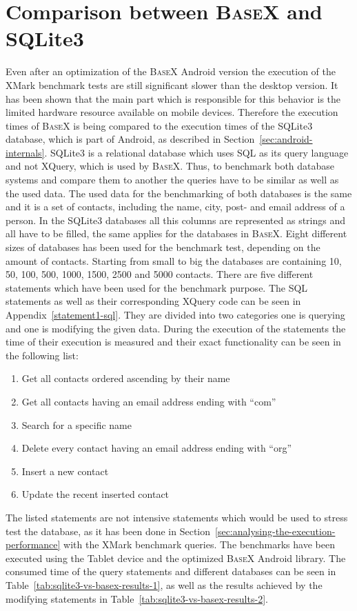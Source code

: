 \section{Comparison between \textsc{BaseX} and SQLite3}
\label{sec:comparison-between-basex-and-sqlite}
Even after an optimization of the \textsc{BaseX} Android version the execution of the XMark benchmark tests are still significant slower than the desktop version.
It has been shown that the main part which is responsible for this behavior is the limited hardware resource available on mobile devices.
Therefore the execution times of \textsc{BaseX} is being compared to the execution times of the SQLite3 database, which is part of Android, as described in Section~\ref{sec:android-internals}.
SQLite3 is a relational database which uses SQL as its query language and not XQuery, which is used by \textsc{BaseX}.
Thus, to benchmark both database systems and compare them to another the queries have to be similar as well as the used data.
The used data for the benchmarking of both databases is the same and it is a set of contacts, including the name, city, post- and email address of a person.
In the SQLite3 databases all this columns are represented as strings and all have to be filled, the same applies for the databases in \textsc{BaseX}.
Eight different sizes of databases has been used for the benchmark test, depending on the amount of contacts.
Starting from small to big the databases are containing 10, 50, 100, 500, 1000, 1500, 2500 and 5000 contacts.
There are five different statements which have been used for the benchmark purpose.
The SQL statements as well as their corresponding XQuery code can be seen in Appendix~\ref{statement1-sql}.
They are divided into  two categories one is querying and one is modifying the given data.
During the execution of the statements the time of their execution is measured and their exact functionality can be seen in the following list:
\begin{enumerate}
	\item Get all contacts ordered ascending by their name
	\item Get all contacts having an email address ending with ``com''
	\item Search for a specific name
	\item Delete every contact having an email address ending with ``org''
	\item Insert a new contact
	\item Update the recent inserted contact
\end{enumerate}
The listed statements are not intensive statements which would be used to stress test the database, as it has been done in Section~\ref{sec:analysing-the-execution-performance} with the XMark benchmark queries.
The benchmarks have been executed using the Tablet device and the optimized \textsc{BaseX} Android library.
The consumed time of the query statements and different databases can be seen in Table~\ref{tab:sqlite3-vs-basex-results-1}, as well as the results achieved by the modifying statements in Table~\ref{tab:sqlite3-vs-basex-results-2}.


